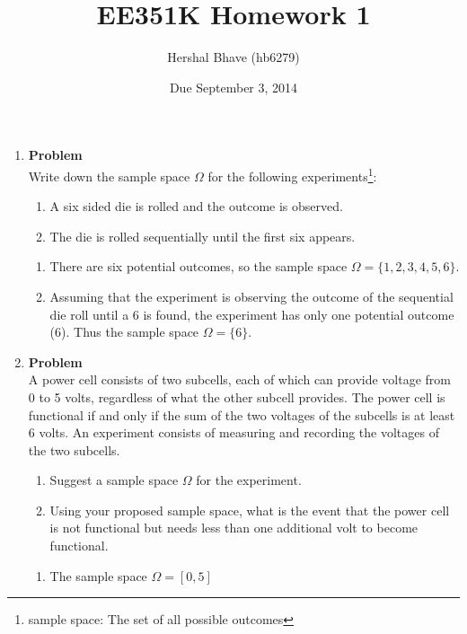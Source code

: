 \documentclass[12pt]{article}
\title{EE351K Homework 1}
\author{Hershal Bhave (hb6279)}
\date{Due September 3, 2014}
\newenvironment{Ex}{\textbf{Problem}\vspace{.75em}\\}{}
\begin{document}
\maketitle
\begin{enumerate}
\item
  \begin{Ex}
    Write down the sample space $\Omega$ for the following
    experiments\footnote{sample space: The set of all possible
      outcomes}:
    \begin{enumerate}
    \item A six sided die is rolled and the outcome is observed.
    \item The die is rolled sequentially until the first six appears.
    \end{enumerate}
    \begin{solution} \hfill
      \begin{enumerate}
      \item There are six potential outcomes, so the sample space
        $\Omega = \{1,2,3,4,5,6\}$.
      \item Assuming that the experiment is observing the outcome of
        the sequential die roll until a 6 is found, the experiment has
        only one potential outcome (6). Thus the sample space $\Omega
        = \{6\}$.
      \end{enumerate}
    \end{solution}
  \end{Ex}
\item
  \begin{Ex}
    A power cell consists of two subcells, each of which can provide
    voltage from 0 to 5 volts, regardless of what the other subcell
    provides. The power cell is functional if and only if the sum of
    the two voltages of the subcells is at least 6 volts. An
    experiment consists of measuring and recording the voltages of the
    two subcells.
    \begin{enumerate}
    \item Suggest a sample space $\Omega$ for the experiment.
    \item Using your proposed sample space, what is the event that the
      power cell is not functional but needs less than one additional
      volt to become functional.
    \end{enumerate}
    \begin{solution} \hfill
      \begin{enumerate}
      \item The sample space $\Omega = [0,5]$

\end{enumerate}
\end{solution}
\end{Ex}
\end{enumerate}
\end{document}
